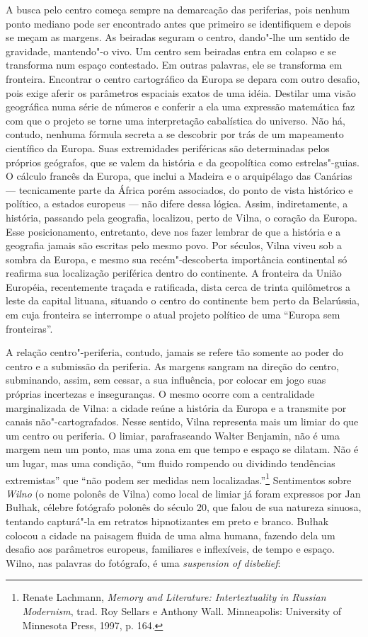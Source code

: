 A busca pelo centro começa sempre na demarcação das periferias, pois
nenhum ponto mediano pode ser encontrado antes que primeiro se
identifiquem e depois se meçam as margens. As beiradas seguram o centro,
dando"-lhe um sentido de gravidade, mantendo"-o vivo. Um centro sem
beiradas entra em colapso e se transforma num espaço contestado. Em
outras palavras, ele se transforma em fronteira. Encontrar o centro
cartográfico da Europa se depara com outro desafio, pois exige aferir os
parâmetros espaciais exatos de uma idéia. Destilar uma visão geográfica
numa série de números e conferir a ela uma expressão matemática faz com
que o projeto se torne uma interpretação cabalística do universo. Não
há, contudo, nenhuma fórmula secreta a se descobrir por trás de um
mapeamento científico da Europa. Suas extremidades periféricas são
determinadas pelos próprios geógrafos, que se valem da história e da
geopolítica como estrelas"-guias. O cálculo francês da Europa, que inclui
a Madeira e o arquipélago das Canárias --- tecnicamente parte da África
porém associados, do ponto de vista histórico e político, a estados
europeus --- não difere dessa lógica. Assim, indiretamente, a história,
passando pela geografia, localizou, perto de Vilna, o coração da Europa.
Esse posicionamento, entretanto, deve nos fazer lembrar de que a
história e a geografia jamais são escritas pelo mesmo povo. Por séculos,
Vilna viveu sob a sombra da Europa, e mesmo sua recém"-descoberta
importância continental só reafirma sua localização periférica dentro do
continente. A fronteira da União Européia, recentemente traçada e
ratificada, dista cerca de trinta quilômetros a leste da capital
lituana, situando o centro do continente bem perto da Belarússia, em
cuja fronteira se interrompe o atual projeto político de uma ``Europa
sem fronteiras''.

A relação centro"-periferia, contudo, jamais se refere tão somente ao
poder do centro e a submissão da periferia. As margens sangram na
direção do centro, subminando, assim, sem cessar, a sua influência, por
colocar em jogo suas próprias incertezas e inseguranças. O mesmo ocorre
com a centralidade marginalizada de Vilna: a cidade reúne a história da
Europa e a transmite por canais não"-cartografados. Nesse sentido, Vilna
representa mais um limiar do que um centro ou periferia. O limiar,
parafraseando Walter Benjamin, não é uma margem nem um ponto, mas uma
zona em que tempo e espaço se dilatam. Não é um lugar, mas uma condição,
``um fluido rompendo ou dividindo tendências extremistas'' que ``não
podem ser medidas nem localizadas.''\footnote{Renate Lachmann,
  \emph{Memory and Literature: Intertextuality in Russian Modernism},
  trad. Roy Sellars e Anthony Wall. Minneapolis: University of Minnesota
  Press, 1997, p. 164.} Sentimentos sobre \emph{Wilno} (o nome polonês
de Vilna) como local de limiar já foram expressos por Jan Bułhak,
célebre fotógrafo polonês do século 20, que falou de sua natureza
sinuosa, tentando capturá"-la em retratos hipnotizantes em preto e
branco. Bułhak colocou a cidade na paisagem fluida de uma alma humana,
fazendo dela um desafio aos parâmetros europeus, familiares e
inflexíveis, de tempo e espaço. Wilno, nas palavras do fotógrafo, é uma
\emph{suspension of disbelief}:


